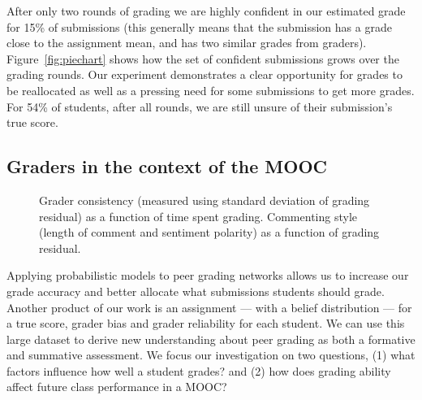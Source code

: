 After only two rounds of grading we are highly confident in our estimated grade for 15\% of submissions (this generally means that the submission has a grade close to the assignment mean, and has two similar grades from graders). Figure~\ref{fig:piechart} shows how the set of confident submissions grows over the grading rounds. Our experiment demonstrates a clear opportunity for grades to be reallocated as well as a pressing need for some submissions to get more grades. For 54\% of students, after all rounds, we are still unsure of their submission's true score.

\subsection{Graders in the context of the MOOC}
\begin{figure}[t!]
\begin{center}
\end{center}
\caption[Insight into peer graders]{
  Grader consistency (measured using standard deviation of grading residual) as
a function of time spent grading.
 Commenting style (length of comment and sentiment polarity) as a function of grading residual.
}
\end{figure}

Applying probabilistic models to peer grading networks allows us to increase our grade accuracy and better allocate
what submissions students should grade. Another product
of our work is an assignment --- with a belief distribution --- for a true score, grader bias and grader reliability
for each student. We can use this large dataset to derive
new understanding about peer grading as both a formative
and summative assessment. We focus our investigation on
two questions, (1) what factors influence  how well a student
grades? and (2) how does grading ability affect future class
performance in a MOOC?

